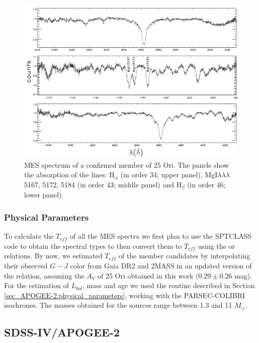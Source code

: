 \documentclass[12pt]{article}
\begin{document}
\begin{figure}[ht!]
	\centering
	\includegraphics[width=1.\textwidth]{MES_spectrum.pdf}
	\caption[MES spectrum of a confirmed member of 25 Ori]{MES spectrum of a confirmed member of 25 Ori. The panels show the absorption of the lines: H$_\alpha$ (in order 34; upper panel), MgI$\lambda\lambda\lambda$5167, 5172, 5184 (in order 43; middle panel) and H$_\beta$ (in order 46; lower panel).}
	\label{fig_MES:spectrum}
\end{figure}

\subsubsection{Physical Parameters}
\label{sec_MES:membership}
To calculate the $T_{eff}$ of all the MES spectra we first plan to use the SPTCLASS code to obtain the spectral types to then convert them to $T_{eff}$ using the \citet{Kenyon-Hartmann1995} or \citet{Pecaut2013} relations. By now, we estimated $T_{eff}$ of the member candidates by interpolating their observed $G-J$ color from Gaia DR2 and 2MASS in an updated version of the \citet{Kenyon-Hartmann1995} relation, assuming the $A_V$ of 25 Ori obtained in this work ($0.29\pm0.26$ mag). For the estimation of $L_{bol}$, mass and age we used the routine described in Section \ref{sec_APOGEE-2:physical_parameters}, working with the PARSEC-COLIBRI isochrones. The masses obtained for the sources range between 1.3 and 11 $M_\odot$.

\subsection{SDSS-IV/APOGEE-2}
\label{sec:APOGEE-2}
\end{document}
